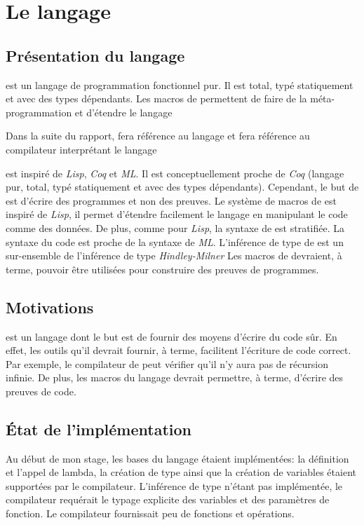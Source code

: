 \chapter{Le langage \typer{}}

    \section{Présentation du langage}
        \typer{} est un langage de programmation fonctionnel pur. Il est total, typé statiquement et avec des types dépendants.
        Les macros de \typer{} permettent de faire de la méta-programmation et d'étendre le langage

        Dans la suite du rapport, \say{\typer{}} fera référence au langage \typer{} et  fera référence au compilateur
        interprétant le langage \typer{}

        \typer{} est inspiré de \textit{Lisp}, \textit{Coq} et \textit{ML}.
        Il est conceptuellement proche de \textit{Coq} (langage pur, total, typé statiquement et avec des types dépendants). Cependant, le but de \typer{}
        est d'écrire des programmes et non des preuves.
        Le système de macros de \typer{} est inspiré de \textit{Lisp}, il permet d'étendre facilement le langage
        en manipulant le code comme des données. De plus, comme pour \textit{Lisp}, la syntaxe de \typer{} est stratifiée.
        La syntaxe du code est proche de la syntaxe de \textit{ML}. L'inférence de type de \typer{} est un sur-ensemble de l'inférence de type
        \textit{Hindley-Milner}
        Les macros de \typer{} devraient, à terme, pouvoir être utilisées pour construire des preuves de programmes. %

    \section{Motivations}
        \typer{} est un langage dont le but est de fournir des moyens d'écrire du code sûr.
        En effet, les outils qu'il devrait fournir, à terme, facilitent l'écriture de code correct.
        Par exemple, le compilateur de \typer{} peut vérifier qu'il n'y aura pas de récursion infinie.
        De plus, les macros du langage devrait permettre, à terme, d'écrire des preuves de code.

    \section{État de l'implémentation}
        Au début de mon stage, les bases du langage étaient implémentées:
        la définition et l'appel de lambda, la création de type ainsi que la création de variables étaient supportées par le compilateur.
        L'inférence de type n'étant pas implémentée, le compilateur requérait le typage explicite des variables et des paramètres de fonction.
        Le compilateur fournissait peu de fonctions et opérations.

